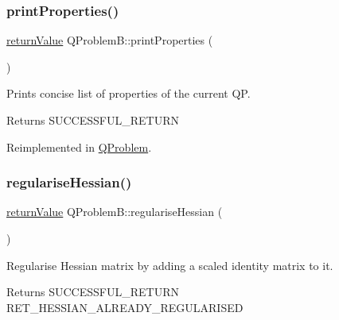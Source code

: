\subsubsection{\texorpdfstring{print\+Properties()}{printProperties()}}
{\footnotesize\ttfamily \hyperlink{_message_handling_8hpp_a81d556f613bfbabd0b1f9488c0fa865e}{return\+Value} Q\+Problem\+B\+::print\+Properties (\begin{DoxyParamCaption}{ }\end{DoxyParamCaption})\hspace{0.3cm}{\ttfamily [virtual]}}

Prints concise list of properties of the current QP. \begin{DoxyReturn}{Returns}
S\+U\+C\+C\+E\+S\+S\+F\+U\+L\+\_\+\+R\+E\+T\+U\+RN ~\newline
 
\end{DoxyReturn}


Reimplemented in \hyperlink{class_q_problem_a589e2b01326f871820f24d47fa4372e8}{Q\+Problem}.

\mbox{\label{class_q_problem_b_a8377ea426acc7a7b78a0c78944ded1b4}} 
\subsubsection{\texorpdfstring{regularise\+Hessian()}{regulariseHessian()}}
{\footnotesize\ttfamily \hyperlink{_message_handling_8hpp_a81d556f613bfbabd0b1f9488c0fa865e}{return\+Value} Q\+Problem\+B\+::regularise\+Hessian (\begin{DoxyParamCaption}{ }\end{DoxyParamCaption})\hspace{0.3cm}{\ttfamily [protected]}}

Regularise Hessian matrix by adding a scaled identity matrix to it. \begin{DoxyReturn}{Returns}
S\+U\+C\+C\+E\+S\+S\+F\+U\+L\+\_\+\+R\+E\+T\+U\+RN ~\newline
 R\+E\+T\+\_\+\+H\+E\+S\+S\+I\+A\+N\+\_\+\+A\+L\+R\+E\+A\+D\+Y\+\_\+\+R\+E\+G\+U\+L\+A\+R\+I\+S\+ED 
\end{DoxyReturn}
\mbox{\label{class_q_problem_b_a975c13e1a8fbe8c3e9c4dfbce9dc9a71}} 

